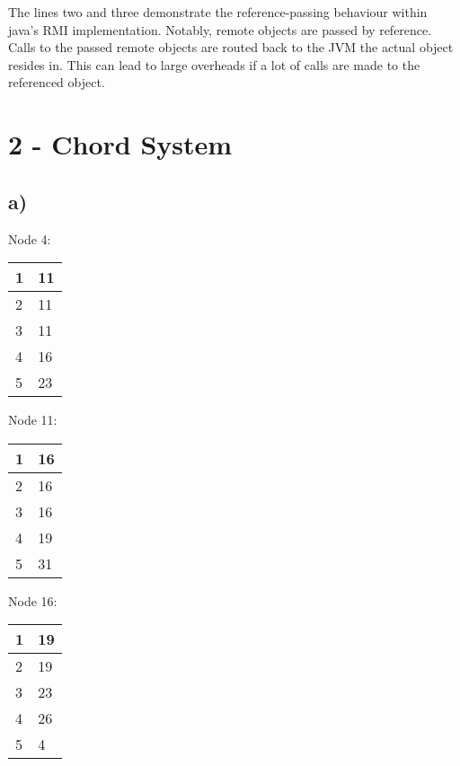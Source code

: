\documentclass{scrartcl}
\begin{document}
The lines two and three demonstrate the reference-passing behaviour within java's RMI implementation. 
Notably, remote objects are passed by reference. 
Calls to the passed remote objects are routed back to the JVM the actual object resides in. 
This can lead to large overheads if a lot of calls are made to the referenced object.

\section*{2 - Chord System}
\subsection*{a)}

	\begin{minipage}[t]{.25\linewidth}
        \centering
        Node 4:\\
			\begin{tabular}{|l|l|}
				\hline
				1 & 11 \\ \hline
				2 & 11 \\ \hline
				3 & 11 \\ \hline
				4 & 16 \\ \hline
				5 & 23 \\ \hline
			\end{tabular}
	\end{minipage}%
	\begin{minipage}[t]{.25\linewidth}
        \centering
        Node 11:\\
		\begin{tabular}{|l|l|}
			\hline
			1 & 16 \\ \hline
			2 & 16 \\ \hline
			3 & 16 \\ \hline
			4 & 19 \\ \hline
			5 & 31 \\ \hline
		\end{tabular}
	\end{minipage}%
	\begin{minipage}[t]{.25\linewidth}
        \centering
        Node 16:\\
		\begin{tabular}{|l|l|}
			\hline
			1 & 19 \\ \hline
			2 & 19 \\ \hline
			3 & 23 \\ \hline
			4 & 26 \\ \hline
			5 & 4 \\ \hline
		\end{tabular}
    \end{minipage}
\end{document}
